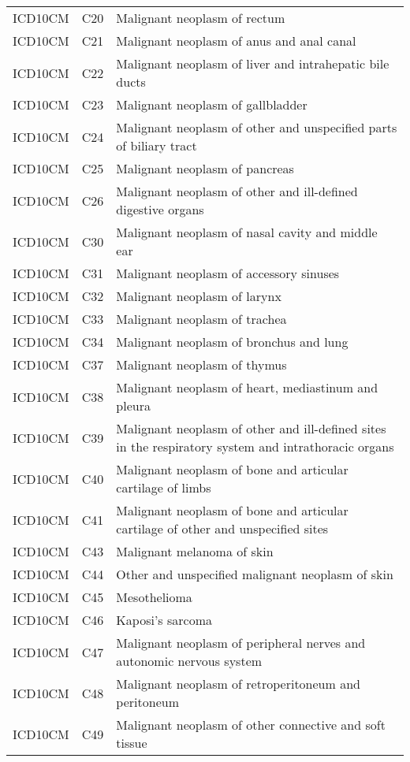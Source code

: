 \begin{longtable}{p{}p{}p{}}
  ICD10CM & C20 & Malignant neoplasm of rectum \\ 
  ICD10CM & C21 & Malignant neoplasm of anus and anal canal \\ 
  ICD10CM & C22 & Malignant neoplasm of liver and intrahepatic bile ducts \\ 
  ICD10CM & C23 & Malignant neoplasm of gallbladder \\ 
  ICD10CM & C24 & Malignant neoplasm of other and unspecified parts of biliary tract \\ 
  ICD10CM & C25 & Malignant neoplasm of pancreas \\ 
  ICD10CM & C26 & Malignant neoplasm of other and ill-defined digestive organs \\ 
  ICD10CM & C30 & Malignant neoplasm of nasal cavity and middle ear \\ 
  ICD10CM & C31 & Malignant neoplasm of accessory sinuses \\ 
  ICD10CM & C32 & Malignant neoplasm of larynx \\ 
  ICD10CM & C33 & Malignant neoplasm of trachea \\ 
  ICD10CM & C34 & Malignant neoplasm of bronchus and lung \\ 
  ICD10CM & C37 & Malignant neoplasm of thymus \\ 
  ICD10CM & C38 & Malignant neoplasm of heart, mediastinum and pleura \\ 
  ICD10CM & C39 & Malignant neoplasm of other and ill-defined sites in the respiratory system and intrathoracic organs \\ 
  ICD10CM & C40 & Malignant neoplasm of bone and articular cartilage of limbs \\ 
  ICD10CM & C41 & Malignant neoplasm of bone and articular cartilage of other and unspecified sites \\ 
  ICD10CM & C43 & Malignant melanoma of skin \\ 
  ICD10CM & C44 & Other and unspecified malignant neoplasm of skin \\ 
  ICD10CM & C45 & Mesothelioma \\ 
  ICD10CM & C46 & Kaposi's sarcoma \\ 
  ICD10CM & C47 & Malignant neoplasm of peripheral nerves and autonomic nervous system \\ 
  ICD10CM & C48 & Malignant neoplasm of retroperitoneum and peritoneum \\ 
  ICD10CM & C49 & Malignant neoplasm of other connective and soft tissue \\ 

\end{longtable}
